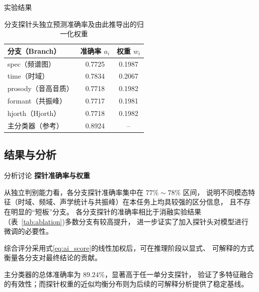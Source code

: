 \documentclass[aspectratio=169]{beamer}
\providecommand{\paragraph}[1]{\smallskip\textbf{#1}\par}
\begin{document}
\begin{frame}{实验结果}

\begin{table}[htbp]
\centering
\caption{分支探针头独立预测准确率及由此推导出的归一化权重}
\label{tab:probe-acc-weight}
\begin{tabular}{lcc}
\toprule
分支（Branch） & 准确率 $a_i$ & 权重 $w_i$ \\
\midrule
spec（频谱图）      & 0.7725 & 0.1987 \\
time（时域）        & 0.7834 & 0.2067 \\
prosody（音高音质） & 0.7718 & 0.1982 \\
formant（共振峰）   & 0.7717 & 0.1981 \\
hjorth（Hjorth）    & 0.7718 & 0.1982 \\
\midrule
主分类器（参考）    & 0.8924 & -- \\
\bottomrule
\end{tabular}
\end{table}
\end{frame}


\subsection{结果与分析}
\begin{frame}{分析讨论}
\paragraph{探针准确率与权重} 

从独立判别能力看，各分支探针准确率集中在 $77\%\sim78\%$ 区间，
说明不同模态特征（时域、频域、声学统计与共振峰）在本任务上均具较强的区分信息，
且不存在明显的“短板”分支。
各分支探针的准确率相比于消融实验结果（表~\ref{tab:ablation})多数分支有较高提升，
进一步证实了加入探针头对模型进行微调的必要性。

综合评分采用式\ref{eq:ai_score}的线性加权后，可在推理阶段以显式、
可解释的方式衡量各分支对最终结论的贡献。

主分类器的总体准确率为 $89.24\%$，显著高于任一单分支探针，
验证了多特征融合的有效性；而探针权重的近似均衡分布则为后续的可解释分析提供了稳定基线。
\end{frame}
\end{document}
